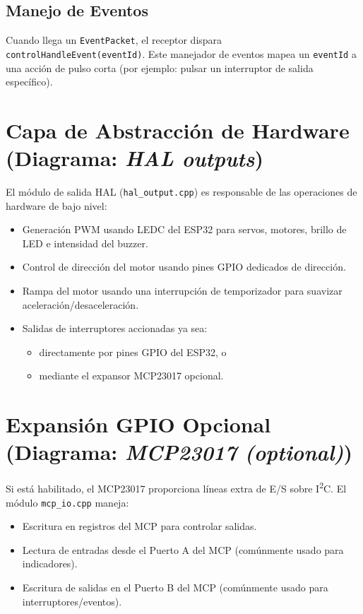 \subsection{Manejo de Eventos}
Cuando llega un \texttt{EventPacket}, el receptor dispara \texttt{controlHandleEvent(eventId)}.
Este manejador de eventos mapea un \texttt{eventId} a una acción de pulso corta (por ejemplo: pulsar un interruptor de salida específico).

\section{Capa de Abstracción de Hardware (Diagrama: \textit{HAL outputs})}

El módulo de salida HAL (\texttt{hal\_output.cpp}) es responsable de las operaciones de hardware de bajo nivel:

\begin{itemize}
    \item Generación PWM usando LEDC del ESP32 para servos, motores, brillo de LED e intensidad del buzzer.
    \item Control de dirección del motor usando pines GPIO dedicados de dirección.
    \item Rampa del motor usando una interrupción de temporizador para suavizar aceleración/desaceleración.
    \item Salidas de interruptores accionadas ya sea:
    \begin{itemize}
        \item directamente por pines GPIO del ESP32, o
        \item mediante el expansor MCP23017 opcional.
    \end{itemize}
\end{itemize}

\section{Expansión GPIO Opcional (Diagrama: \textit{MCP23017 (optional)})}

Si está habilitado, el MCP23017 proporciona líneas extra de E/S sobre I\textsuperscript{2}C.
El módulo \texttt{mcp\_io.cpp} maneja:

\begin{itemize}
    \item Escritura en registros del MCP para controlar salidas.
    \item Lectura de entradas desde el Puerto A del MCP (comúnmente usado para indicadores).
    \item Escritura de salidas en el Puerto B del MCP (comúnmente usado para interruptores/eventos).
\end{itemize}

